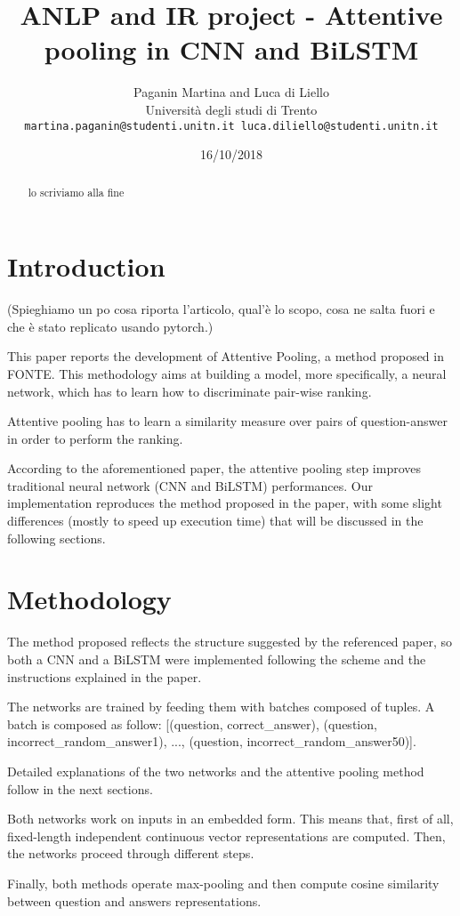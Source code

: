 \documentclass[11pt,a4paper]{article}
\title{ANLP and IR project - Attentive pooling in CNN and BiLSTM}
\author{Paganin Martina and Luca di Liello \\
  Universit\`a degli studi di Trento \\
  {\tt martina.paganin@studenti.unitn.it
       luca.diliello@studenti.unitn.it} \\
}
\date{16/10/2018}
\begin{document}
\maketitle
\begin{abstract}
  lo scriviamo alla fine
\end{abstract}

\section{Introduction}
(Spieghiamo un po cosa riporta l'articolo, qual'è lo scopo, cosa ne salta fuori e che è stato replicato usando pytorch.)

This paper reports the development of Attentive Pooling, a method proposed in FONTE. This methodology aims at building a model, more specifically, a neural network, which has to learn how to discriminate pair-wise ranking.

Attentive pooling has to learn a similarity measure over pairs of question-answer in order to perform the ranking. 

According to the aforementioned paper, the attentive pooling step improves traditional neural network (CNN and BiLSTM) performances. 
Our implementation reproduces the method proposed in the paper, with some slight differences (mostly to speed up execution time) that will be discussed in the following sections.

\section{Methodology}
The method proposed reflects the structure suggested by the referenced paper, so both a CNN and a BiLSTM were implemented following the scheme and the instructions explained in the paper.

The networks are trained by feeding them with batches composed of tuples. A batch is composed as follow: [(question, correct\_answer), (question, incorrect\_random\_answer1), ..., (question, incorrect\_random\_answer50)].

Detailed explanations of the two networks and the attentive pooling method follow in the next sections.

Both networks work on inputs in an embedded form. This means that, first of all, fixed-length independent continuous vector representations are computed. Then, the networks proceed through different steps.

Finally, both methods operate max-pooling and then compute cosine similarity between question and answers representations. 
\end{document}
